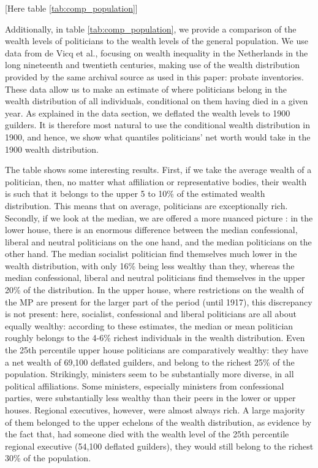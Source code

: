     \begin{center}
        [Here table \ref{tab:comp_population}]
    \end{center}
    
    Additionally, in table \ref{tab:comp_population}, we provide a comparison of the wealth levels of politicians to the wealth levels of the general population. We use data from de Vicq et al., focusing on wealth inequality in the Netherlands in the long nineteenth and twentieth centuries, making use of the wealth distribution provided by the same archival source as used in this paper: probate inventories.\autocite{de2020exploring} These data allow us to make an estimate of where politicians belong in the wealth distribution of all individuals, conditional on them having died in a given year. As explained in the data section, we deflated the wealth levels to 1900 guilders. It is therefore most natural to use the conditional wealth distribution in 1900, and hence, we show what quantiles politicians' net worth would take in the 1900 wealth distribution. 
    
    The table shows some interesting results. First, if we take the average wealth of a politician, then, no matter what affiliation or representative bodies, their wealth is such that it belongs to the upper 5 to 10\% of the estimated wealth distribution. This means that on average, politicians are exceptionally rich. Secondly, if we look at the median, we are offered a more nuanced picture : in the lower house, there is an enormous difference between the median confessional, liberal and neutral politicians on the one hand, and the median politicians on the other hand. The median socialist politician find themselves much lower in the wealth distribution, with only 16\% being less wealthy than they, whereas the median confessional, liberal and neutral politicians find themselves in the upper 20\% of the distribution. In the upper house, where restrictions on the wealth of the MP are present for the larger part of the period (until 1917), this discrepancy is not present: here, socialist, confessional and liberal politicians are all about equally wealthy: according to these estimates, the median or mean politician roughly belongs to the 4-6\% richest individuals in the wealth distribution. Even the 25th percentile upper house politicians are comparatively wealthy: they have a net wealth of 69,100 deflated guilders, and belong to the richest 25\% of the population. Strikingly, ministers seem to be substantially more diverse, in all political affiliations. Some ministers, especially ministers from confessional parties, were substantially less wealthy than their peers in the lower or upper houses. Regional executives, however, were almost always rich. A large majority of them belonged to the upper echelons of the wealth distribution, as evidence by the fact that, had someone died with the wealth level of the 25th percentile regional executive (54,100 deflated guilders), they would still belong to the richest 30\% of the population. 
    
